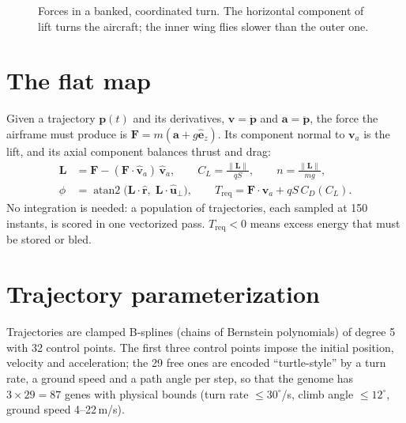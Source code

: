 \documentclass[11pt,a4paper,oneside]{report}
\newcommand{\vect}[1]{\boldsymbol{#1}}
\newcommand{\CL}{C_L}
\begin{document}
\begin{figure}[ht]\centering
{}
\caption{Forces in a banked, coordinated turn. The horizontal component of lift turns the aircraft; the inner wing flies slower than the outer one.}\label{fig:forces}
\end{figure}

\section{The flat map}\label{sec:flat}
Given a trajectory $\vect p(t)$ and its derivatives, $\vect v = \dot{\vect p}$ and $\vect a = \ddot{\vect p}$, the force the airframe must produce is $\vect F = m(\vect a + g\hat{\vect e}_z)$. Its component normal to $\vect v_a$ is the lift, and its axial component balances thrust and drag:
\begin{align}
\vect L &= \vect F - (\vect F\cdot\hat{\vect v}_a)\,\hat{\vect v}_a, \qquad \CL = \frac{\|\vect L\|}{qS}, \qquad n = \frac{\|\vect L\|}{mg},\\
\phi &= \operatorname{atan2}\big(\vect L\cdot\hat{\vect r},\; \vect L\cdot\hat{\vect u}_\perp\big), \qquad
T_{\mathrm{req}} = \vect F\cdot\hat{\vect v}_a + qS\,C_D(\CL).
\end{align}
No integration is needed: a population of trajectories, each sampled at 150 instants, is scored in one vectorized pass. $T_{\mathrm{req}}<0$ means excess energy that must be stored or bled.

\section{Trajectory parameterization}
Trajectories are clamped B-splines (chains of Bernstein polynomials) of degree 5 with 32 control points. The first three control points impose the initial position, velocity and acceleration; the 29 free ones are encoded ``turtle-style'' by a turn rate, a ground speed and a path angle per step, so that the genome has $3\times 29 = 87$ genes with physical bounds (turn rate $\le 30^\circ$/s, climb angle $\le 12^\circ$, ground speed 4--22\,m/s).
\end{document}
